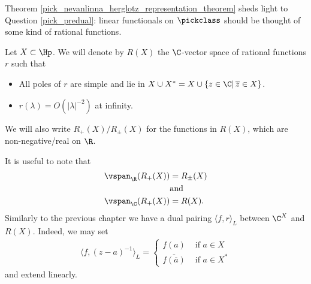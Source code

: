 Theorem \ref{pick_nevanlinna_herglotz_representation_theorem} sheds light to Question \ref{pick_predual}: linear functionals on $\pickclass$ should be thought of some kind of rational functions.
\begin{maar}
	Let $X \subset \Hp$. We will denote by $R(X)$ the $\C$-vector space of rational functions $r$ such that
	\begin{itemize}
		\item All poles of $r$ are simple and lie in $X \cup X^{*} = X \cup \{z \in \C |\, \overline{z} \in X\}$.
		\item $r(\lambda) = O(|\lambda|^{-2})$ at infinity.
	\end{itemize}
	We will also write $R_{+}(X)/R_{\pm}(X)$ for the functions in $R(X)$, which are non-negative/real on $\R$.
\end{maar}
It is useful to note that
\begin{align}\label{pick_functional_span}
	\vspan_{\R}(R_{+}(X)) &= R_{\pm}(X) \nonumber \\
	&\text{and} \\
	\vspan_{\C}(R_{+}(X)) &= R(X). \nonumber
\end{align}
Similarly to the previous chapter we have a dual pairing $\langle f, r \rangle_{L}$ between $\C^{X}$ and $R(X)$. Indeed, we may set
\begin{align*}
	\langle f, (z - a)^{-1} \rangle_{L} =
	\begin{cases}
		f(a) & \text{ if $a \in X$} \\
		\overline{f(\overline{a})} & \text{ if $a \in X^{*}$}
	\end{cases}
\end{align*}
and extend linearly.

